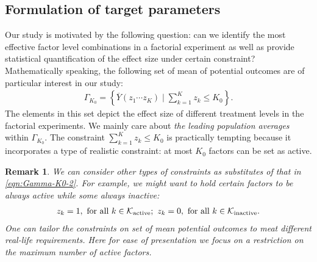 \documentclass[12pt]{article}
\newtheorem{remark}{Remark}
\begin{document}
\subsection{Formulation of target parameters}
Our study is motivated by the following question: can we identify the most effective factor level combinations in a factorial experiment as well as provide statistical quantification of the effect size under certain constraint? Mathematically speaking, the following set of mean of potential outcomes are of particular interest in our study:
\begin{align}\label{eqn:Gamma-K0-2}
    \Gamma_{K_0} = \left\{\overline{Y}(z_1\cdots z_K)\mid \sum_{k=1}^K{z_k} \le K_0\right\}.
\end{align}
The elements in this set depict the effect size of different treatment levels in the factorial experiments. We mainly care about \textit{the leading population averages} within $\Gamma_{K_0}$. The constraint $\sum_{k=1}^K{z_k} \le K_0$ is practically tempting because it incorporates a type of realistic constraint: at most $K_0$ factors can be set as active. 
\begin{remark}
We can consider other types of constraints as substitutes of that in \eqref{eqn:Gamma-K0-2}. For example, we might want to hold certain factors to be always active  while some always inactive:
\begin{align*}
    z_{k} = 1,\text{ for all } k\in{\mathcal{K}}_{\operatorname{active}}; ~ z_{k} = 0,\text{ for all } k\in{\mathcal{K}}_{\operatorname{inactive}}.
\end{align*}
One can tailor the constraints on set of mean potential outcomes to meat different real-life requirements.  Here for ease of presentation we focus on a restriction on the maximum number of active factors. 
\end{remark}
\end{document}
